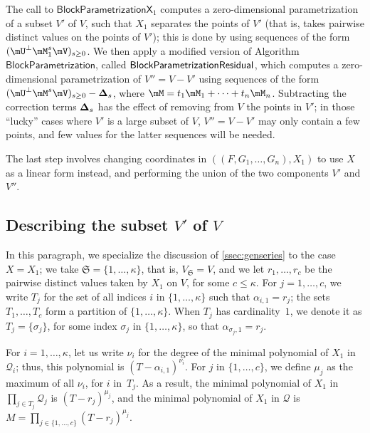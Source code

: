 \documentclass[12pt]{article}
\newcommand{\mat}[1]{\bm{\MakeUppercase{#1}}} %
\newcommand{\mainalgoname}{\mathsf{ BlockParametrization}}
\newcommand{\lf}{X}
\newcommand{\residueI}{\mathscr{Q}}
\def\dg{\kappa}
\begin{document}
The call to $\mathsf{BlockParametrizationX}_1$ computes a zero-dimensional
parametrization of a subset $V'$ of $V$, such that $X_1$ separates the
points of $V'$ (that is, takes pairwise distinct values on the points
of $V'$); this is done by using sequences of the form $(\mU^\perp
\mM_1^s \mV)_{s \ge 0}$. We then apply a modified version of Algorithm
$\mainalgoname$, called $\mainalgoname{\sf Residual}$, which computes
a zero-dimensional parametrization of $V''=V-V'$ using sequences of
the form $(\mU^\perp \mM^s \mV)_{s \ge 0} - \mat{\Delta}_s$, where
$\mM= t_1 \mM_1 + \cdots + t_n \mM_n$. Subtracting the correction
terms $\mat{\Delta}_s$ has the effect of removing from $V$ the points
in $V'$; in those ``lucky'' cases where $V'$ is a large subset of $V$,
$V''=V-V'$ may only contain a few points, and few values for the
latter sequences will be needed.

The last step involves changing coordinates in
$((F,G_1,\dots,G_n),X_1)$ to use $\lf$ as a linear form instead, and
performing the union of the two components $V'$ and $V''$.


\subsection{Describing the subset \texorpdfstring{$V'$}{V'} of \texorpdfstring{$V$}{V}}

In this paragraph, we specialize the discussion of
\cref{ssec:genseries} to the case $\lf=X_1$; we take
$\mathfrak{S}=\{1,\dots,\dg\}$, that is, $V_{\mathfrak{S}}=V$, and we
let $r_1,\dots,r_c$ be the pairwise distinct values taken by $X_1$ on
$V$, for some $c \le \dg$.  For $j=1,\dots,c$, we write $T_j$ for the
set of all indices $i$ in $\{1,\dots,\dg\}$ such that
$\alpha_{i,1}=r_j$; the sets $T_1,\dots,T_c$ form a partition of
$\{1,\dots,\dg\}$. When $T_j$ has cardinality~$1$, we denote it as
$T_j=\{\sigma_j\}$, for some index $\sigma_j$ in $\{1,\dots,\dg\}$, so
that $\alpha_{\sigma_j,1}=r_j$.

For $i=1,\dots,\dg$, let us write $\nu_i$ for the degree of the minimal
polynomial of $X_1$ in $\residueI_i$; thus, this polynomial is
$(T-\alpha_{i,1})^{\nu_i}$. For $j$ in $\{1,\dots,c\}$, we define
$\mu_j$ as the maximum of all $\nu_i$, for $i$ in~$T_j$. As a result, the minimal
polynomial of $X_1$ in $\prod_{j \in T_j} \residueI_j$ is 
$(T-r_j)^{\mu_j}$, and the minimal polynomial of $X_1$ in $\residueI$ is
$M=\prod_{j \in \{1,\dots,c\}} (T-r_j)^{\mu_j}$.
\end{document}
